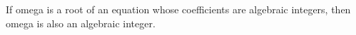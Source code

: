 If omega is a root of an equation whose coefficients are algebraic integers, then omega is also an algebraic integer.
